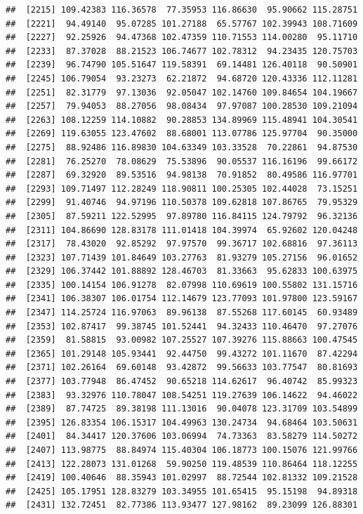 \documentclass[
]{article}
\begin{document}
\begin{verbatim}
##  [2215] 109.42383 116.36578  77.35953 116.86630  95.90662 115.28751
##  [2221]  94.49140  95.07285 101.27188  65.57767 102.39943 108.71609
##  [2227]  92.25926  94.47368 102.47359 110.71553 114.00280  95.11710
##  [2233]  87.37028  88.21523 106.74677 102.78312  94.23435 120.75703
##  [2239]  96.74790 105.51647 119.58391  69.14481 126.40118  90.50901
##  [2245] 106.79054  93.23273  62.21872  94.68720 120.43336 112.11281
##  [2251]  82.31779  97.13036  92.05047 102.14760 109.84654 104.19667
##  [2257]  79.94053  88.27056  98.08434  97.97087 100.28530 109.21094
##  [2263] 108.12259 114.10882  90.28853 134.89969 115.48941 104.30541
##  [2269] 119.63055 123.47602  88.68001 113.07786 125.97704  90.35000
##  [2275]  88.92486 116.89830 104.63349 103.33528  70.22861  94.87530
##  [2281]  76.25270  78.08629  75.53896  90.05537 116.16196  99.66172
##  [2287]  69.32920  89.53516  94.98138  70.91852  80.49586 116.97701
##  [2293] 109.71497 112.28249 118.90811 100.25305 102.44028  73.15251
##  [2299]  91.40746  94.97196 110.50378 109.62818 107.86765  79.95329
##  [2305]  87.59211 122.52995  97.89780 116.84115 124.79792  96.32136
##  [2311] 104.86690 128.83178 111.01418 104.39974  65.92602 120.04248
##  [2317]  78.43020  92.85292  97.97570  99.36717 102.68816  97.36113
##  [2323] 107.71439 101.84649 103.27763  81.93279 105.27156  96.01652
##  [2329] 106.37442 101.88892 128.46703  81.33663  95.62833 100.63975
##  [2335] 100.14154 106.91278  82.07998 110.69619 100.55802 131.15716
##  [2341] 106.38307 106.01754 112.14679 123.77093 101.97800 123.59167
##  [2347] 114.25724 116.97063  89.96138  87.55268 117.60145  60.93489
##  [2353] 102.87417  99.38745 101.52441  94.32433 110.46470  97.27076
##  [2359]  81.58815  93.00982 107.25527 107.39276 115.88663 100.47545
##  [2365] 101.29148 105.93441  92.44750  99.43272 101.11670  87.42294
##  [2371] 102.26164  69.60148  93.42872  99.56633 103.77547  80.81693
##  [2377] 103.77948  86.47452  90.65218 114.62617  96.40742  85.99323
##  [2383]  93.32976 110.78047 108.54251 119.27639 106.14622  94.46022
##  [2389]  87.74725  89.38198 111.13016  90.04078 123.31709 103.54899
##  [2395] 126.83354 106.15317 104.49963 130.24734  94.68464 103.50631
##  [2401]  84.34417 120.37606 103.06994  74.73363  83.58279 114.50272
##  [2407] 113.98775  88.84974 115.40304 106.18773 100.15076 121.99766
##  [2413] 122.28073 131.01268  59.90250 119.48539 110.86464 118.12255
##  [2419] 100.40646  88.35943 101.02997  88.72544 102.81332 109.21528
##  [2425] 105.17951 128.83279 103.34955 101.65415  95.15198  94.89318
##  [2431] 132.72451  82.77386 113.93477 127.98162  89.23099 126.88301

\end{verbatim}
\end{document}
